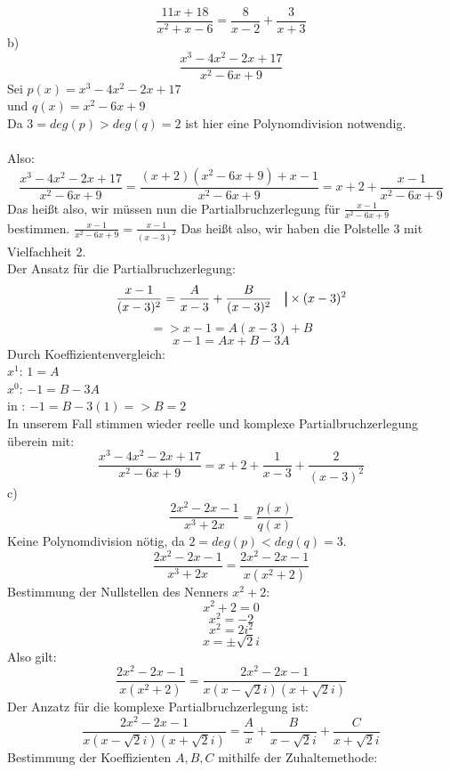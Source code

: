 \documentclass[11pt]{article}
\newcommand\mybar{\kern1pt\rule[-\dp\strutbox]{.8pt}{\baselineskip}\kern1pt}
\newcommand*\circled[1]{\tikz[baseline=(char.base)]{
            \node[shape=circle,draw,inner sep=2pt] (char) {#1};}}
\begin{document}
				$$\frac{11x+18}{x^2+x-6}=\frac{8}{x-2}+\frac{3}{x+3}$$
			\indent b)\\
				$$\frac{x^3-4x^2-2x+17}{x^2-6x+9}$$
				Sei $p(x)=x^3-4x^2-2x+17$\\
				und $q(x)=x^2-6x+9$\\
				Da $3=deg(p)>deg(q)=2$ ist hier eine Polynomdivision notwendig.\\
				\\
				Also:\\
				$$\frac{x^3-4x^2-2x+17}{x^2-6x+9}=\frac{(x+2)(x^2-6x+9)+x-1}{x^2-6x+9}=x+2+\frac{x-1}{x^2-6x+9}$$
				Das heißt also, wir müssen nun die Partialbruchzerlegung für $\frac{x-1}{x^2-6x+9}$ bestimmen.
				$\frac{x-1}{x^2-6x+9}=\frac{x-1}{(x-3)^2}$ \hspace{10pt} Das heißt also, wir haben die Polstelle 3 mit Vielfachheit 2.\\
				Der Ansatz für die Partialbruchzerlegung:\\
				$$\frac{x-1}{(x-3)^2}=\frac{A}{x-3}+\frac{B}{(x-3)^2} \hspace{10pt} \mybar \times (x-3)^2$$
				$$=>x-1=A(x-3)+B$$
				$$x-1=Ax+B-3A$$
				Durch Koeffizientenvergleich:\\
				\indent $x^1$: $1=A$ \circled{1}\\
				\indent $x^0$: $-1=B-3A$ \circled{2}\\
				\circled{1} in \circled{2}: $-1=B-3(1) => B=2$\\
				In unserem Fall stimmen wieder reelle und komplexe Partialbruchzerlegung überein mit:\\
				$$\frac{x^3-4x^2-2x+17}{x^2-6x+9}=x+2+\frac{1}{x-3}+\frac{2}{(x-3)^2}$$
			\indent c)\\
				$$\frac{2x^2-2x-1}{x^3+2x}=\frac{p(x)}{q(x)}$$
				Keine Polynomdivision nötig, da $2=deg(p)<deg(q)=3$.\\
				$$\frac{2x^2-2x-1}{x^3+2x}=\frac{2x^2-2x-1}{x(x^2+2)}$$
				Bestimmung der Nullstellen des Nenners $x^2+2$:\\
				$$x^2+2=0$$
				$$x^2=-2$$
				$$x^2=2i^2$$
				$$x=\pm \sqrt{2}i$$
				Also gilt:\\
				$$\frac{2x^2-2x-1}{x(x^2+2)}=\frac{2x^2-2x-1}{x(x-\sqrt{2}i)(x+\sqrt{2}i)}$$
				Der Anzatz für die komplexe Partialbruchzerlegung ist:\\
				$$\frac{2x^2-2x-1}{x(x-\sqrt{2}i)(x+\sqrt{2}i)}=\frac{A}{x}+\frac{B}{x-\sqrt{2}i}+\frac{C}{x+\sqrt{2}i}$$
				Bestimmung der Koeffizienten $A,B,C$ mithilfe der Zuhaltemethode:\\
\end{document}
